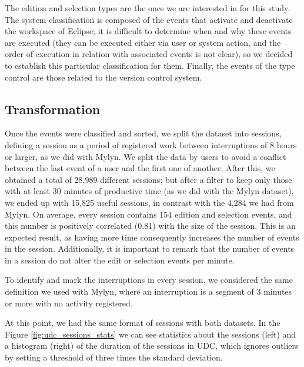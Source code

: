 \documentclass[times]{smrauth}
\begin{document}
The edition and selection types are the ones we are interested in for this study. The system classification is composed of the events that activate and deactivate the workspace of Eclipse; it is difficult to determine when and why these events are executed (they can be executed either via user or system action, and the order of execution in relation with associated events is not clear), so we decided to establish this particular classification for them. Finally, the events of the type control are those related to the version control system. 

\subsection{Transformation}
Once the events were classified and sorted, we split the dataset into sessions, defining a session as a period of registered work between interruptions of 8 hours or larger, as we did with Mylyn. We split the data by users to avoid a conflict between the last event of a user and the first one of another. After this, we obtained a total of 28,989 different sessions; but after a filter to keep only those with at least 30 minutes of productive time (as we did with the Mylyn dataset), we ended up with 15,825 useful sessions, in contrast with the 4,284 we had from Mylyn. On average, every session contains 154 edition and selection events, and this number is positively correlated (0.81) with the size of the session. This is an expected result, as having more time consequently increases the number of events in the session. Additionally, it is important to remark that the number of events in a session do not alter the edit or selection events per minute.

To identify and mark the interruptions in every session, we considered the same definition we used with Mylyn, where an interruption is a segment of 3 minutes or more with no activity registered. 

At this point, we had the same format of sessions with both datasets. In the Figure \ref{fig:udc_sessions_stats} we can see statistics about the sessions (left) and a histogram (right) of the duration of the sessions in UDC, which ignores outliers by setting a threshold of three times the standard deviation.
\end{document}
